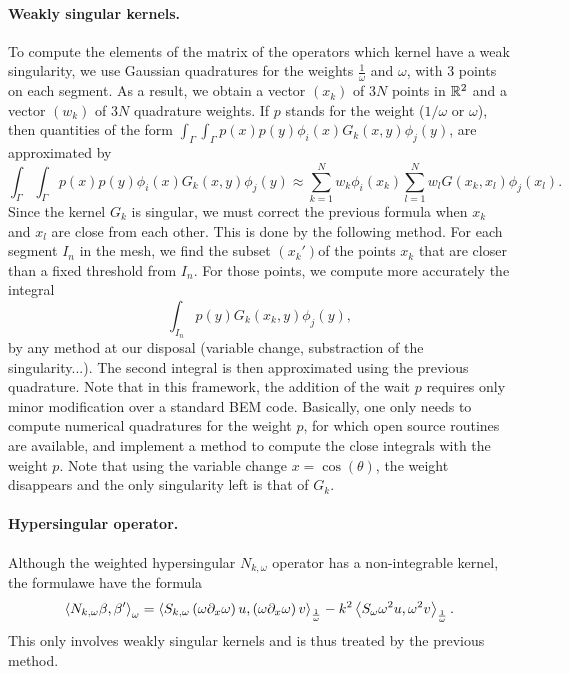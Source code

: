 \documentclass[a4paper]{article}
\begin{document}
\paragraph{Weakly singular kernels.} To compute the elements of the matrix of the operators which kernel have a weak singularity, we use Gaussian quadratures for the weights $\frac{1}{\omega}$ and $\omega$, with $3$ points on each segment. As a result, we obtain a vector $(x_k)$ of $3N$ points in $\mathbb{R}^2$ and a vector $(w_k)$ of $3N$ quadrature weights. If $p$ stands for the weight ($1/\omega$ or $\omega$), then quantities of the form $\int_\Gamma \int_\Gamma  p(x)p(y)\phi_i(x) G_k(x,y) \phi_j(y)$, are approximated by
\begin{equation}
\label{approxDoubleIntegral}
	\int_\Gamma \int_\Gamma   p(x)p(y)\phi_i(x) G_k(x,y) \phi_j(y) \approx \sum_{k = 1}^N w_k \phi_i(x_k) \sum_{l = 1}^N  w_l G(x_k,x_l) \phi_j(x_l).
\end{equation}
Since the kernel $G_k$ is singular, we must correct the previous formula when $x_k$ and $x_l$ are close from each other. This is done by the following method. For each segment $I_n$ in the mesh, we find the subset $(x_k')$of the points $x_k$ that are closer than a fixed threshold from $I_n$. For those points, we compute more accurately the integral 
\[ \int_{I_n} p(y)G_k(x_k,y) \phi_j(y),\]
by any method at our disposal (variable change, substraction of the singularity...). The second integral is then approximated using the previous quadrature. 
Note that in this framework, the addition of the wait $p$ requires only minor modification over a standard BEM code. Basically, one only needs to compute numerical quadratures for the weight $p$, for which open source routines are available, and implement a method to compute the close integrals with the weight $p$. Note that using the variable change $x = \cos(\theta)$, the weight disappears and the only singularity left is that of $G_k$. 

\paragraph{Hypersingular operator.} Although the weighted hypersingular $N_{k,\omega}$ operator has a non-integrable kernel, the formulawe have the formula
\[\left\langle N_{k,\omega} \beta,\beta'\right\rangle_\omega = \left\langle S_{k,\omega}\left(\omega \partial_x \omega \right)u,\left(\omega \partial_x \omega \right) v\right\rangle_\frac{1}{\omega} - k^2 \left\langle S_\omega \omega^2 u,\omega^2 v\right\rangle_\frac{1}{\omega}.\]
This only involves weakly singular kernels and is thus treated by the previous method. 
\end{document}
